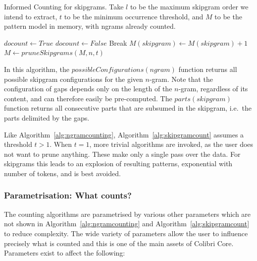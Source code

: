 \begin{algorithm} \caption{Informed Counting for skipgrams.  Take $l$
to be the maximum skipgram order we intend to extract, $t$ to be the minimum occurrence threshold, and $M$ to be the
pattern model in memory, with ngrams already counted.}
\label{alg:skipgramcount}
\begin{algorithmic}
            \State $docount \leftarrow True$
                    \State $docount \leftarrow False$
                    Break
                \EndIf
            \EndFor
                \State $M(skipgram) \leftarrow M(skipgram) + 1$
            \EndIf
            \EndFor
            \EndFor
    \State $M \leftarrow pruneSkipgrams(M,n,t)$
\EndFor \\
\end{algorithmic}
\end{algorithm}

In this algorithm, the $possibleConfigurations(ngram)$ function returns
all possible skipgram configurations for the given $n$-gram. Note that
the configuration of gaps depends only on the length of the $n$-gram, regardless
of its content, and can therefore easily be pre-computed. The
$parts(skipgram)$ function returns all consecutive parts that are
subsumed in the skipgram, i.e.\ the parts delimited by the gaps.

Like Algorithm~\ref{alg:ngramcounting}, Algorithm~\ref{alg:skipgramcount}
assumes a threshold $t>1$. When $t=1$, more trivial algorithms are
invoked, as the user does not want to prune anything. These make only a single
pass over the data. For skipgrams this leads to an explosion of
resulting patterns, exponential with number of tokens, and is best avoided.

\subsubsection{Parametrisation: What counts?}
\label{sec:whatcounts}

The counting algorithms are parametrised by various other parameters which
are not shown in Algorithm~\ref{alg:ngramcounting} and
Algorithm~\ref{alg:skipgramcount} to reduce complexity. The wide variety of
parameters allow the user to influence precisely what is counted and this is one
of the main assets of Colibri Core. Parameters exist to affect the following:

